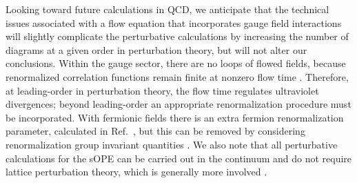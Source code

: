 Looking toward future calculations in QCD, we anticipate that 
the technical issues associated with a flow equation that incorporates gauge 
field interactions will slightly complicate the perturbative calculations by 
increasing the number of diagrams at a given order in perturbation theory, but 
will not alter our conclusions. Within the gauge sector, there are no loops of 
flowed fields, because renormalized correlation functions remain finite at 
nonzero flow time \cite{Luscher:2011bx}. Therefore, at leading-order in 
perturbation theory, the flow time regulates ultraviolet divergences; beyond 
leading-order an appropriate renormalization procedure must be incorporated. 
With fermionic fields there is an extra fermion renormalization parameter, 
calculated in Ref.~\cite{Luscher:2013cpa}, but this can be removed by 
considering 
renormalization group invariant quantities \cite{Luscher:2013cpa}. We also note 
that all perturbative calculations for the sOPE can be carried out in the 
continuum and do not require lattice perturbation theory, which is generally 
more involved \cite{Monahan:2013dla,Capitani:2002mp}.
